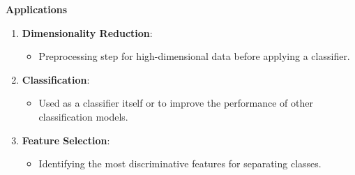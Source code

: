 \documentclass{article}
\providecommand{\tightlist}{%
      \setlength{\itemsep}{0pt}\setlength{\parskip}{0pt}}
\begin{document}
\textbf{Applications}

\begin{enumerate}
\def\labelenumi{\arabic{enumi}.}
\tightlist
\item
  \textbf{Dimensionality Reduction}:

  \begin{itemize}
  \tightlist
  \item
    Preprocessing step for high-dimensional data before applying a
    classifier.
  \end{itemize}
\item
  \textbf{Classification}:

  \begin{itemize}
  \tightlist
  \item
    Used as a classifier itself or to improve the performance of other
    classification models.
  \end{itemize}
\item
  \textbf{Feature Selection}:

  \begin{itemize}
  \tightlist
  \item
    Identifying the most discriminative features for separating classes.
  \end{itemize}
\end{enumerate}
\end{document}
